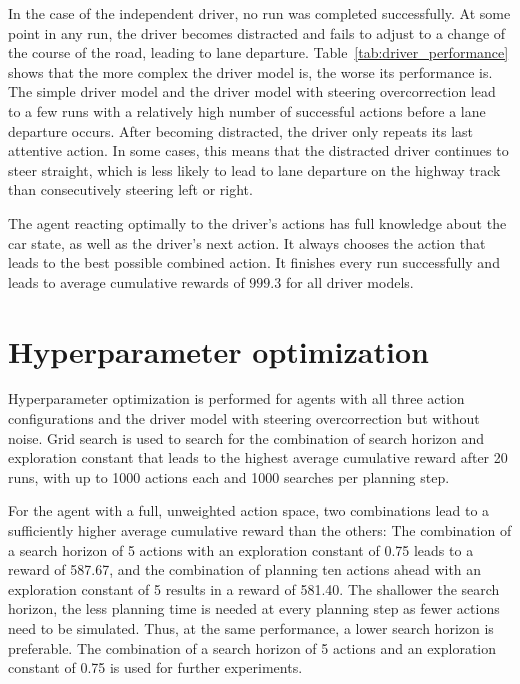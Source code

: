 In the case of the independent driver, no run was completed successfully. At some point in any run, the driver becomes distracted and fails to adjust to a change of the course of the road, leading to lane departure. Table~\ref{tab:driver_performance} shows that the more complex the driver model is, the worse its performance is. The simple driver model and the driver model with steering overcorrection lead to a few runs with a relatively high number of successful actions before a lane departure occurs. After becoming distracted, the driver only repeats its last attentive action. In some cases, this means that the distracted driver continues to steer straight, which is less likely to lead to lane departure on the highway track than consecutively steering left or right.

The agent reacting optimally to the driver's actions has full knowledge about the car state, as well as the driver's next action. It always chooses the action that leads to the best possible combined action. It finishes every run successfully and leads to average cumulative rewards of $999.3$ for all driver models.



\section{Hyperparameter optimization}
\label{sec:grid_search}

Hyperparameter optimization is performed for agents with all three action configurations and the driver model with steering overcorrection but without noise. Grid search is used to search for the combination of search horizon and exploration constant that leads to the highest average cumulative reward after 20 runs, with up to 1000 actions each and 1000 searches per planning step.



For the agent with a full, unweighted action space, two combinations lead to a sufficiently higher average cumulative reward than the others: The combination of a search horizon of 5 actions with an exploration constant of 0.75 leads to a reward of 587.67, and the combination of planning ten actions ahead with an exploration constant of 5 results in a reward of 581.40. The shallower the search horizon, the less planning time is needed at every planning step as fewer actions need to be simulated. Thus, at the same performance, a lower search horizon is preferable. The combination of a search horizon of 5 actions and an exploration constant of 0.75 is used for further experiments.


